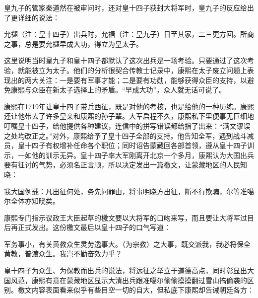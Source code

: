
皇九子的管家秦道然在被审问时，还对皇十四子获封大将军时，皇九子的反应给出了更详细的说法：



\begin{bookquote}允禵（注：皇十四子）出兵时，允禟（注：皇九子）日至其家，二三更方回。所商之事，总是要允禵早成大功，得立为皇太子。\end{bookquote}


这里说明当时皇九子和皇十四子都默认了这次出兵是一场考验。只要通过了这次考验，就能被立为太子。他们的分析很契合传教士记录中，康熙在太子废立问题上表现出的两大关注：一是要有军事才能；二是要有功勋，能够获得众臣的支持，以避免康熙与众臣在新太子选择上的矛盾。“早成大功”，众人就无话可说了。



康熙在1719年让皇十四子带兵西征，既是对他的考核，也是给他的一种历练。康熙还让他带去了许多皇亲和康熙的孙子辈。大军启程不久，康熙私下里便事无巨细地叮嘱皇十四子，给他提供各种建议，连信中的拼写错误都给指了出来：“满文谬误之处均改正之。”对外，康熙给予了皇十四子全部的支持。他告知全军，遇到战斗减员，皇十四子有权增补任命各个职位；同时诏告蒙藏回各部首领，遵从皇十四子训示，一如他的训示无异。皇十四子率大军刚离开北京一个多月，康熙认为大国出兵要有征讨的气势，必须名正言顺，所以决定发出一篇檄文，让蒙藏地区的人民知晓：



\begin{bookquote}我大国例载：凡出征何处，务先问罪由，将事明晓方出征，断不行欺骗，尔等准噶尔全体亦知晓矣。\end{bookquote}


康熙专门指示议政王大臣起草的檄文要以大将军的口吻来写，而且要让大将军过目后再正式发出。这份檄文最后以皇十四子的口气写道：



\begin{bookquote}军务事小，有关黄教众生灵劳逸事大。（为宗教）之大事，既交派我，我必将保全黄教，普渡众生。我岂不勤奋效力乎？\end{bookquote}


皇十四子为众生、为保教而出兵的说法，将远征之举立于道德高点，同时彰显出大国风范，康熙有意在蒙藏地区显示大清出兵跟准噶尔偷偷摸摸翻过雪山搞偷袭的区别。檄文内容表面看来似乎有些目空一切的自大，但私底下康熙却告诫朝廷各方：


